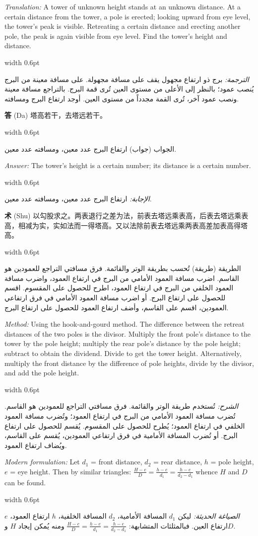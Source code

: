 \documentclass[11pt,a4paper]{article}
\newlength{\cnwidth}
\newlength{\arwidth}
\newcommand{\paralleltext}[2]{%
  \par\medskip\noindent
  \begin{minipage}[t]{\cnwidth}%
    \small #1%
  \end{minipage}%
  \hfill\textcolor{colrule}{\vrule width 0.6pt}\hfill
  \begin{minipage}[t]{\arwidth}%
    \small\arabicfont\beginR #2\endR%
  \end{minipage}%
  \par\medskip
}
\newcommand{\cnlabel}[1]{\textbf{\color{notecolor}#1}}
\newcommand{\arlabel}[1]{\arabicfontbf\color{notecolor}\beginR #1\endR}
\begin{document}
\paralleltext{%
\textit{Translation:} A tower of unknown height stands at an unknown distance. At a certain distance from the tower, a pole is erected; looking upward from eye level, the tower's peak is visible. Retreating a certain distance and erecting another pole, the peak is again visible from eye level. Find the tower's height and distance.
}{%
\textit{الترجمة:} برج ذو ارتفاع مجهول يقف على مسافة مجهولة. على مسافة معينة من البرج يُنصب عمود؛ بالنظر إلى الأعلى من مستوى العين تُرى قمة البرج. بالتراجع مسافة معينة ونصب عمود آخر، تُرى القمة مجدداً من مستوى العين. أوجد ارتفاع البرج ومسافته.
}

\paralleltext{%
\cnlabel{答} (Da) 塔高若干，去塔远若干。
}{%
\arlabel{الجواب} (جواب) ارتفاع البرج عدد معين، ومسافته عدد معين.
}

\paralleltext{%
\textit{Answer:} The tower's height is a certain number; its distance is a certain number.
}{%
\textit{الإجابة:} ارتفاع البرج عدد معين، ومسافته عدد معين.
}

\paralleltext{%
\cnlabel{术} (Shu) 以勾股求之。两表退行之差为法，前表去塔远乘表高，后表去塔远乘表高，相减为实，实如法而一得塔高。又以法除前表去塔远乘两表高差加表高得塔高。
}{%
\arlabel{الطريقة} (طريقة) تُحسب بطريقة الوتر والقائمة. فرق مسافتي التراجع للعمودين هو القاسم. اضرب مسافة العمود الأمامي من البرج في ارتفاع العمود، واضرب مسافة العمود الخلفي من البرج في ارتفاع العمود، اطرح للحصول على المقسوم. اقسم للحصول على ارتفاع البرج. أو اضرب مسافة العمود الأمامي في فرق ارتفاعي العمودين، اقسم على القاسم، وأضف ارتفاع العمود للحصول على ارتفاع البرج.
}

\paralleltext{%
\textit{Method:} Using the hook-and-gourd method. The difference between the retreat distances of the two poles is the divisor. Multiply the front pole's distance to the tower by the pole height; multiply the rear pole's distance by the pole height; subtract to obtain the dividend. Divide to get the tower height. Alternatively, multiply the front distance by the difference of pole heights, divide by the divisor, and add the pole height.
}{%
\textit{الشرح:} تُستخدم طريقة الوتر والقائمة. فرق مسافتي التراجع للعمودين هو القاسم. تُضرب مسافة العمود الأمامي من البرج في ارتفاع العمود؛ وتُضرب مسافة العمود الخلفي في ارتفاع العمود؛ يُطرح للحصول على المقسوم. يُقسم للحصول على ارتفاع البرج. أو تُضرب المسافة الأمامية في فرق ارتفاعي العمودين، يُقسم على القاسم، ويُضاف ارتفاع العمود.
}

\paralleltext{%
\textit{Modern formulation:} Let $d_1$ = front distance, $d_2$ = rear distance, $h$ = pole height, $e$ = eye height. Then by similar triangles: $\frac{H-e}{D} = \frac{h-e}{d_1} = \frac{h-e}{d_2 - d_1}$ whence $H$ and $D$ can be found.
}{%
\textit{الصياغة الحديثة:} ليكن $d_1$ المسافة الأمامية، $d_2$ المسافة الخلفية، $h$ ارتفاع العمود، $e$ ارتفاع العين. فبالمثلثات المتشابهة: $\frac{H-e}{D} = \frac{h-e}{d_1} = \frac{h-e}{d_2 - d_1}$ ومنه يُمكن إيجاد $H$ و$D$.
}
\end{document}
